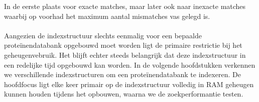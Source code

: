 In de eerste plaats voor exacte matches, maar later ook naar inexacte matches waarbij op voorhad het maximum aantal mismatches vas gelegd is.
\\ \\
Aangezien de indexstructuur slechts eenmalig voor een bepaalde proteïnendatabank opgebouwd moet worden ligt de primaire restrictie bij het geheugenvebruik.
Het blijft echter steeds belangrijk dat deze indexstructuur in een redelijke tijd opgebouwd kan worden. %
In de volgende hoofdstukken verkennen we verschillende indexstructuren om een proteïnendatabank te indexeren.
De hoofdfocus ligt elke keer primair op de indexstructuur volledig in RAM geheugen kunnen houden tijdens het opbouwen, waarna we de zoekperformantie testen.


